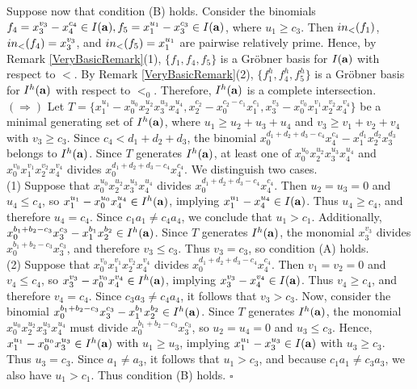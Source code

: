 \documentclass[10pt,a4paper]{amsart}
\begin{document}
Suppose now that condition (B) holds. Consider the binomials $f_{4}=x_{3}^{v_3}-x_{4}^{c_4} \in I({\bf a}), f_{5}=x_{1}^{u_1}-x_{3}^{c_3} \in I({\bf a})$, where $u_1 \geq c_3$. Then ${\rm in}_{<}(f_{1})$, ${\rm in}_{<}(f_{4})=x_{3}^{v_3}$, and ${\rm in}_{<}(f_{5})=x_{1}^{u_1}$ are pairwise relatively prime. Hence, by Remark \ref{VeryBasicRemark}(1), $\{f_1, f_4, f_5\}$ is a Gr\"obner basis for $I({\bf a})$ with respect to $<$. By Remark \ref{VeryBasicRemark}(2), $\{f_1^h, f_4^h, f_5^h\}$ is a Gr\"obner basis for $I^{h}({\bf a})$ with respect to $<_{0}$. Therefore, $I^{h}({\bf a})$ is a complete intersection.\\
$(\Rightarrow)$ Let $T=\{x_{1}^{u_1}-x_{0}^{u_0}x_{2}^{u_2}x_{3}^{u_3}x_{4}^{u_4}, x_{2}^{c_2}-x_{0}^{c_2-c_1}x_{1}^{c_1}, x_{3}^{v_3}-x_{0}^{v_0}x_{1}^{v_1}x_{2}^{v_2}x_{4}^{v_4}\}$ be a minimal generating set of $I^{h}({\bf a})$, where $u_{1} \geq u_2+u_3+u_4$ and $v_{3} \geq v_1+v_2+v_4$ with $v_3 \geq c_3$. Since $c_{4}<d_{1}+d_{2}+d_3$, the binomial $x_{0}^{d_{1}+d_{2}+d_3-c_{4}}x_{4}^{c_4}-x_{1}^{d_1}x_{2}^{d_2}x_{3}^{d_3}$ belongs to $I^{h}({\bf a})$. Since $T$ generates $I^{h}({\bf a})$, at least one of $x_{0}^{u_0}x_{2}^{u_2}x_{3}^{u_3}x_{4}^{u_4}$ and $x_{0}^{v_0}x_{1}^{v_1}x_{2}^{v_2}x_{4}^{v_4}$ divides $x_{0}^{d_{1}+d_{2}+d_3-c_{4}}x_{4}^{c_4}$. We distinguish two cases.\\ (1) Suppose that $x_{0}^{u_0}x_{2}^{u_2}x_{3}^{u_3}x_{4}^{u_4}$ divides $x_{0}^{d_{1}+d_{2}+d_3-c_{4}}x_{4}^{c_4}$. Then $u_{2}=u_{3}=0$ and $u_{4} \leq c_{4}$, so $x_{1}^{u_1}-x_{0}^{u_0}x_{4}^{u_4} \in I^{h}({\bf a})$, implying $x_{1}^{u_1}-x_{4}^{u_4} \in I({\bf a})$. Thus $u_{4} \geq c_{4}$, and therefore $u_{4}=c_{4}$. Since $c_1a_1 \neq c_4a_4$, we conclude that $u_1>c_1$. Additionally, $x_{0}^{b_1+b_2-c_3}x_{3}^{c_3}-x_{1}^{b_1}x_2^{b_2} \in I^{h}({\bf a})$. Since $T$ generates $I^{h}({\bf a})$, the monomial $x_3^{v_3}$ divides $x_{0}^{b_1+b_2-c_3}x_{3}^{c_3}$, and therefore $v_3 \leq c_3$. Thus $v_3=c_3$, so condition (A) holds.\\
(2) Suppose that $x_{0}^{v_0}x_{1}^{v_1}x_{2}^{v_2}x_{4}^{v_4}$ divides $x_{0}^{d_{1}+d_{2}+d_3-c_{4}}x_{4}^{c_4}$. Then $v_{1}=v_{2}=0$ and $v_{4} \leq c_{4}$, so $x_{3}^{v_3}-x_{0}^{v_0}x_{4}^{v_4} \in I^{h}({\bf a})$, implying $x_{3}^{v_3}-x_{4}^{v_4} \in I({\bf a})$. Thus $v_{4} \geq c_4$, and therefore $v_{4}=c_{4}$. Since $c_{3}a_{3} \neq c_4a_4$, it follows that $v_3>c_{3}$. Now, consider the binomial $x_{0}^{b_1+b_2-c_3}x_{3}^{c_3}-x_{1}^{b_1}x_2^{b_2} \in I^{h}({\bf a})$. Since $T$ generates $I^{h}({\bf a})$, the monomial $x_{0}^{u_0}x_{2}^{u_2}x_{3}^{u_3}x_{4}^{u_4}$ must divide $x_{0}^{b_1+b_2-c_3}x_{3}^{c_3}$, so $u_2=u_4=0$ and $u_3 \leq c_3$. Hence, $x_1^{u_1}-x_{0}^{u_0}x_{3}^{u_3} \in I^{h}({\bf a})$ with $u_1 \geq u_3$, implying $x_1^{u_1}-x_{3}^{u_3} \in I({\bf a})$ with $u_3 \geq c_3$. Thus $u_3=c_3$. Since $a_1 \neq a_3$, it follows that $u_1>c_3$, and because $c_1a_1 \neq c_3a_3$, we also have $u_1>c_1$. Thus condition (B) holds.  \hfill $\square$
\end{document}
